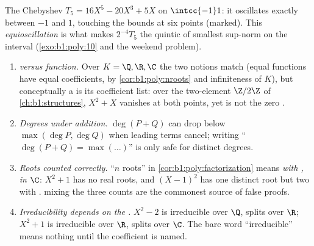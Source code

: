 \begin{omfigure}

{\small The Chebyshev  $T_5 = 16X^5 - 20X^3 + 5X$ on
$\intcc{-1}1$: it oscillates exactly between $-1$ and $1$,
touching the bounds at six points (marked). This
\emph{equioscillation} is what makes $2^{-4}T_5$ the 
quintic of smallest sup-norm on the interval
(\cref{exo:b1:poly:10} and the weekend problem).}
\end{omfigure}

\begin{remark}\label{rem:b1:poly:pitfalls}
\begin{enumerate}
  \item \emph{ versus function.} Over $K = \Q, \R, \C$
        the two notions match (equal functions have equal
        coefficients, by \cref{cor:b1:poly:nroots} and
        infiniteness of $K$), but conceptually a  is
        its coefficient list: over the two-element 
        $\Z/2\Z$ of \cref{ch:b1:structures}, $X^2 + X$ vanishes
        at both points, yet is not the zero .
  \item \emph{Degrees under addition.} $\deg(P + Q)$ can drop
        below $\max(\deg P, \deg Q)$ when leading terms cancel;
        writing ``$\deg(P + Q) = \max(\dots)$'' is only safe for
        distinct degrees.
  \item \emph{Roots counted correctly.} ``$n$ roots'' in
        \cref{cor:b1:poly:factorization} means \emph{with
        , in $\C$}: $X^2 + 1$ has no real roots, and
        $(X-1)^2$ has one distinct root but two with
        .  mixing the three counts are the
        commonest source of false proofs.
  \item \emph{Irreducibility depends on the .} $X^2 - 2$ is
        irreducible over $\Q$, splits over $\R$; $X^2 + 1$ is
        irreducible over $\R$, splits over $\C$. The bare word
        ``irreducible'' means nothing until the coefficient
         is named.
\end{enumerate}
\end{remark}


